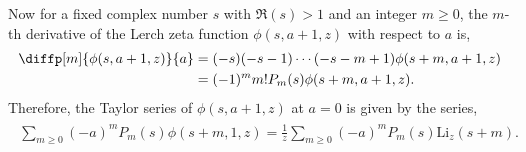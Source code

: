 \documentclass[12pt]{amsart}
\begin{document}
Now for a fixed complex number $s$ with $\Re(s)>1$ and an integer $m\geq 0$, the $m$-th derivative of the Lerch zeta function
$\phi(s,a+1,z)$ with respect to $a$ is,
\begin{align*}
\diffp[m]{\phi(s,a+1,z)}{a}&=(-s)(-s-1)\cdots(-s-m+1){\phi(s+m,a+1,z)}\\
 &=(-1)^mm!P_m(s){\phi(s+m,a+1,z)}.
\end{align*}
Therefore, the Taylor series of ${\phi(s,a+1,z)}$ at $a=0$ is given by the series,
\begin{align}\label{pseries}
\begin{split}
\sum_{m\ge 0}(-a)^mP_m(s){\phi(s+m,1,z)}=\frac{1}{z}\sum_{m\ge 0}(-a)^mP_m(s)\mathrm{Li}_z(s+m).
\end{split}
\end{align}
\end{document}
